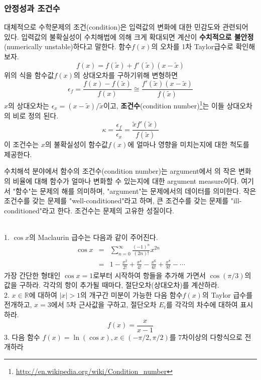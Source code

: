 \subsubsection{안정성과 조건수}
대체적으로 수학문제의 조건(condition)은 입력값의 변화에 대한 민감도와 관련되어 있다. 입력값의 불확실성이 수치해법에 의해 크게 확대되면 계산이 \textbf{수치적으로 불안정}(numerically unstable)하다고 말한다. 함수$f(x)$의 오차를 1차 Taylor급수로 확인해보자.
\begin{equation}
f(x)=f(\tilde{x})+f'(\tilde{x})(x-\tilde{x})
\end{equation}
위의 식을 함수값$f(x)$의 상대오차를 구하기위해 변형하면
\begin{equation}
\epsilon_{f}=\frac{f(x)-f(\tilde{x})}{f(x)}\cong\frac{f'(\tilde{x})(x-\tilde{x})}{f(\tilde{x})}
\end{equation}
$x$의 상대오차는 $\epsilon_{x}=(x-\tilde{x})/\tilde{x}$이고, \textbf{조건수}(condition number)\footnote{\url{http://en.wikipedia.org/wiki/Condition_number}}는 이들 상대오차의 비로 정의 된다.
\begin{equation}
\kappa=\frac{\epsilon_{f}}{\epsilon_{x}}=\frac{\tilde{x}f'(\tilde{x})}{f(\tilde{x})}
\end{equation}
이 조건수는 $x$의 불확실성이 함수값$f(x)$에 얼마나 영향을 미치는지에 대한 척도를 제공한다.

수치해석 분야에서 함수의 조건수(condition number)는 argument에서 의 작은 변화의 비율에 대해 함수가 얼마나 변화할 수 있는지에 대한 argument measure이다. 여기서 "함수"는 문제의 해를 의미하며, "argument"는 문제에서의 데이터를 의미한다. 작은 조건수를 갖는 문제를 "well-conditioned"라고 하며, 큰 조건수를 갖는 문제를 "ill-conditioned"라고 한다. 조건수는 문제의 고유한 성질이다.

\clearpage
{}\\
1. $\cos x$의 Maclaurin 급수는 다음과 같이 주어진다.
\begin{eqnarray*}
\cos x&=&\sum_{n=0}^{\infty}\frac{(-1)^n}{(2n)!}x^{2n}\\
&=&1-\frac{x^2}{2!}+\frac{x^4}{4!}-\frac{x^6}{6!}+\frac{x^8}{8!}-\cdots
\end{eqnarray*}
가장 간단한 형태인 $\cos x =1$로부터 시작하여 항들을 추가해 가면서 $\cos(\pi/3)$의 값을 구하라. 각각의 항이 추가될 때마다, 절단오차(상대오차)를 계산하라.\\
2. $x\in \mathbb{R}$에 대하여 $|x|>1$의 개구간 미분이 가능한 다음 함수$f(x)$의 Taylor 급수를 전개하고, $x=3$에서 5차 근사값을 구하고, 절단오차 $E_{t}$를 각각의 차수에 대하여 표시하라.
\begin{displaymath}
f(x)=\frac{x}{x-1}
\end{displaymath}
3. 다음 함수 $f(x)=\ln(\cos x), x\in (-\pi/2,\pi/2)$를 7차이상의 다항식으로 전개하라\\

